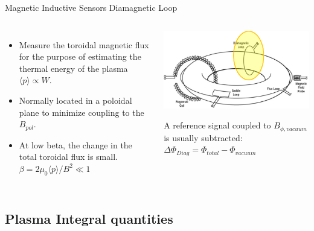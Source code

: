\documentclass{beamer}
\begin{document}
\begin{frame}{Magnetic Inductive Sensors } {Diamagnetic Loop}
\begin{columns}
     \begin{itemize}
	 \item Measure the toroidal magnetic flux for the purpose of estimating the thermal energy of the plasma $\langle p \rangle  \propto W$.
	 \item Normally located in a poloidal plane  to minimize coupling to the $B_{pol}$.
	\item At low beta, the change in the total toroidal flux is small.
	$\beta = 2 \mu_0 \langle p \rangle  /B^2 \ll 1$
     \end{itemize}
	\begin{center}
	\includegraphics[width=1.0\columnwidth]{diamag.png}
	 \begin{block}{}
		 A reference signal coupled to $B_{\phi, vacuum}$ is usually subtracted:
		$ \Delta \Phi_{Diag} =  \Phi_{total}  -   \Phi_{vacuum}$ %
	\end{block}
	\end{center}

\end{columns}
\end{frame}

\subsection{Plasma Integral  quantities }
\end{document}
